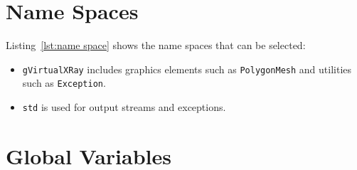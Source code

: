 \documentclass[11pt,oneside,a4paper,final]{article}
\begin{document}
\section{Name Spaces}
\label{sec:Name Spaces}

Listing~\ref{lst:name space} shows the name spaces that can be selected:
\begin{itemize}
 \item \verb+gVirtualXRay+ includes graphics elements such as \verb+PolygonMesh+ 
	and utilities such as \verb+Exception+. 
 \item \verb+std+ is used for output streams and exceptions.
\end{itemize}

\begin{center}

\end{center}


\section{Global Variables}
\label{sec:Global Variables}
\end{document}
